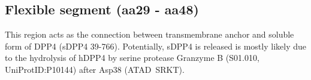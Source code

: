 \subsection{Flexible segment (aa29 - aa48)}

This region acts as the connection between transmembrane anchor and soluble form of DPP4 (sDPP4 39-766). Potentially, sDPP4 is released is mostly likely due to the hydrolysis of hDPP4 by serine protease Granzyme B (S01.010, UniProtID:P10144) after Asp38 (ATAD~\textbar SRKT).~\cite{Song_2018} 
